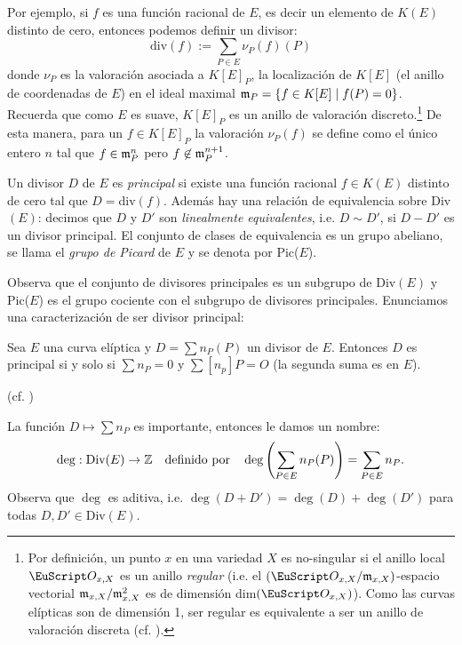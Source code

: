 \documentclass[../../tesis_maestria]{subfiles}
\begin{document}
Por ejemplo, si $f$ es una funci\'on racional de $E$, es decir un elemento de $K(E)$ distinto de
cero, entonces podemos definir un divisor:
\[
  \mathrm{div}(f):=\sum_{P\in E}\nu_P(f) (P)
\]
donde $\nu_P$ es la valoraci\'on asociada a $K[E]_P$, la localizaci\'on de $K[E]$ (el anillo de
coordenadas de $E$) en el ideal maximal $\mathfrak{m}_P=\{f\in K[E]\mid f(P)=0\}$. Recuerda que como $E$
es suave, $K[E]_P$ es un anillo de valoraci\'on discreto.\footnote{Por definici\'on, un punto
  $x$ en una variedad $X$ es no-singular si el anillo local $\Oo_{x,X}$ es un anillo \emph{regular}
  (i.e. el $(\Oo_{x,X}/\m_{x,X})$-espacio vectorial $\mathfrak{m}_{x,X}/\mathfrak{m}_{x,X}^2$ es de dimensi\'on
  dim$(\Oo_{x,X})$). Como las curvas el\'ipticas son de dimensi\'on 1, ser regular es equivalente
  a ser un anillo de valoraci\'on discreta (cf. \cite[\S9,proposici\'on 9.2]{AtiyahITCA}).}
De esta manera, para un $f\in K[E]_P$ la valoraci\'on $\nu_P(f)$ se define como el \'unico entero
$n$ tal que $f\in\mathfrak{m}_P^n$ pero $f\not\in\mathfrak{m}_P^{n+1}$.

\begin{defin} Un divisor $D$ de $E$ es \emph{principal} si existe una funci\'on racional
  $f\in K(E)$ distinto de cero tal que $D=$div$(f)$. Adem\'as hay una relaci\'on
  de equivalencia sobre Div$(E)$: decimos que $D$ y $D'$ son \emph{linealmente equivalentes},
  i.e. $D\sim D'$, si $D-D'$ es un divisor principal. El conjunto de clases de equivalencia
  es un grupo abeliano, se llama  el \emph{grupo de Picard} de $E$ y se denota por Pic($E$).
\end{defin}
\noindent Observa que el conjunto de divisores principales es un subgrupo de Div$(E)$ y Pic($E$) es el
grupo cociente con el subgrupo de divisores principales. Enunciamos una caracterizaci\'on de ser
divisor principal:

\begin{prop}\label{prop:divisor_principal}
  Sea $E$ una curva el\'iptica y $D=\sum n_P(P)$ un divisor de $E$. Entonces $D$ es principal
  si y solo si $\sum n_P=0$ y $\sum [n_p]P=O$ (la segunda suma es en $E$).
\end{prop}
\noindent (cf. \cite[cap\'itulo III, \S3, corolario 3.5]{SilvermanTAOEC})

\begin{nota}
La función $D\mapsto \sum n_P$ es importante, entonces le damos un nombre:
\[
	\deg:\text{Div}(E)\rightarrow\mathbb{Z}\quad\text{definido por}\quad \deg\left( \sum_{P\in E}n_P(P) \right)=\sum_{P\in E}n_P.
\]
Observa que $\deg$ es aditiva, i.e. $\deg(D+D')=\deg(D)+\deg(D')$ para todas $D,D'\in\text{Div}(E)$. 
\end{nota}
\end{document}
